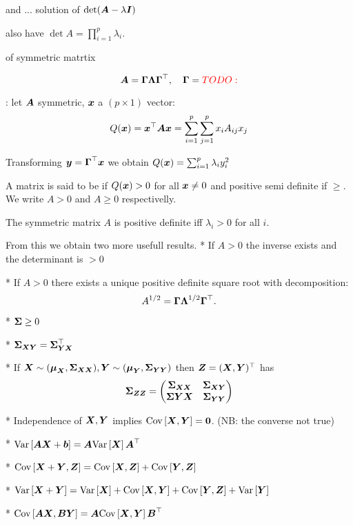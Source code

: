 and  ... solution of $\det(\mA-\lambda \mI)$

also have $\det{A} = \prod_{i=1}^p \lambda_i$.

 of symmetric matrtix

$$
    \mA=\mG\mL\mG^\top, \quad \mG = \TODO{}
$$

: let $\mA$ symmetric, $\x$ a $(p\times 1)$ vector:
$$
    Q(\x) = \x^\top \mA \x = \sum_{i=1}^p\sum_{j=1}^p x_i A_{ij} x_j
$$
\begin{theorem}
    Transforming $\y=\mG^\top\x$ we obtain $Q(\x) = \sum_{i=1}^p \lambda_i y_i^2$
\end{theorem}
A matrix is said to be  if $Q(\x)>0$ for all $\x\ne0$ and positive semi definite if $\geq$. We write $A>0$ and $A\geq 0$ respectivelly. 
\begin{theorem}
    The symmetric matrix $A$ is positive definite iff $\lambda_i > 0$ for all $i$.
\end{theorem}
From this we obtain two more usefull results. 
* If $A>0$ the inverse exists and the determinant is $>0$

* If $A>0$ there exists a unique positive definite square root with decomposition:
$$
    A^{1/2} = \mG\mL^{1/2}\mG^\top.
$$

* $\SS \geq 0$

* $\SS_{\X\Y} = \SS_{\Y\X}^\top$

* If $\X\sim(\M_{\X}, \SS_{\X\X}), \Y\sim(\M_{\Y}, \SS_{\Y\Y})$ then $\Z=(\X,\Y)^\top$ has
$$
    \SS_{\Z\Z} = \begin{pmatrix}
        \SS_{\X\X} & \SS_{\X\Y} \\ \SS{\Y\X} & \SS_{\Y\Y}
    \end{pmatrix}
$$

* Independence of $\X,\Y$ implies $\cov{\X,\Y}=\zero$. (NB: the converse not true)

* $\var{\mA\X+\boldsymbol{b}} = \mA \var{\X}\mA^\top$

* $\cov{\X+\Y, \Z} = \cov{\X, \Z} + \cov{\Y, \Z}$

* $\var{\X+\Y} = \var{\X} + \cov{\X, \Y} + \cov{\Y, \Z} + \var{\Y}$

* $\cov{\mA\X, \mB\Y} = \mA\cov{\X, \Y}\mB^\top$

